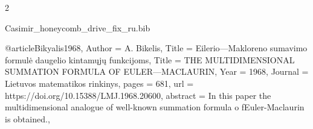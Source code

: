 \documentclass[twoside, 10pt]{article}
\def\myfilename{Casimir_honeycomb_drive_fix_ru}
\begin{document}
\begin{multicols}{2}
\begin{filecontents}{\myfilename.bib}

@article{Bikyalis1968,
    Author = {A. Bikelis},
    Title = {Eilerio—Makloreno sumavimo formulė daugelio kintamųjų funkcijoms},
    Title = {THE MULTIDIMENSIONAL SUMMATION FORMULA OF EULER—MACLAURIN},
    Year = {1968},
    Journal = {Lietuvos matematikos rinkinys},
    pages = {681},
    url = {https://doi.org/10.15388/LMJ.1968.20600},
    abstract = {In this paper the multidimensional analogue of well-known summation formula o fEuler-Maclaurin is obtained.},
}



\end{filecontents}
\end{multicols}
\end{document}
